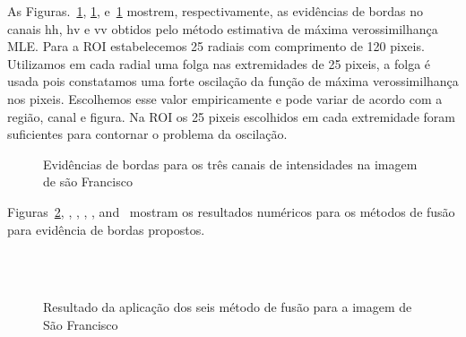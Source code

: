 As Figuras.~\ref{evidencias_sf_hh_hv_vv}, \ref{evidencias_sf_hh_hv_vv}, e~\ref{evidencias_sf_hh_hv_vv} mostrem, respectivamente, as evidências de bordas no canais $\text{hh}$, $\text{hv}$ e $\text{vv}$ obtidos pelo método estimativa de máxima verossimilhança MLE. Para a ROI estabelecemos 25 radiais com comprimento de 120 pixeis. Utilizamos em cada radial uma folga nas extremidades de  25 pixeis, a folga é usada pois constatamos uma forte oscilação da função de máxima verossimilhança nos pixeis. Escolhemos esse valor empiricamente e pode variar de acordo com a região, canal e figura. Na ROI os 25 pixeis escolhidos em cada extremidade foram suficientes para contornar o problema  da oscilação.
\begin{figure}[hbt]
	\centering
     \caption{Evidências de bordas para os três canais de intensidades na imagem de são Francisco}
     \label{evidencias_sf_hh_hv_vv} 
\end{figure}


Figuras~\ref{fusion_sf_met}, , , , , and~ mostram os resultados numéricos para os métodos de fusão para evidência de bordas propostos. 
\begin{figure}[hbt]
	\centering
     \\
     \\
     \caption{Resultado da aplicação dos seis método de fusão para a imagem de São Francisco}
     \label{fusion_sf_met}
\end{figure}

